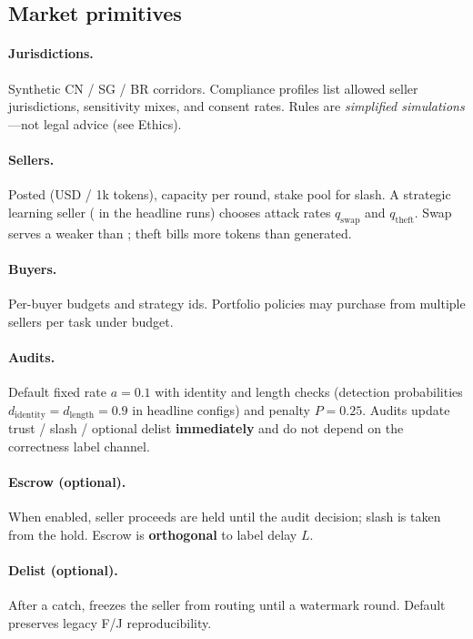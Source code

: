 \documentclass[sigconf,review]{acmart}
\begin{document}
\subsection{Market primitives}
\label{sec:primitives}

\paragraph{Jurisdictions.} Synthetic CN / SG / BR corridors. Compliance profiles list allowed seller jurisdictions, sensitivity mixes, and consent rates. Rules are \emph{simplified simulations}---not legal advice (see Ethics).

\paragraph{Sellers.} Posted  (USD / 1k tokens), capacity per round, stake pool for slash. A strategic learning seller ( in the headline runs) chooses attack rates $q_{\mathrm{swap}}$ and $q_{\mathrm{theft}}$. Swap serves a weaker  than ; theft bills more tokens than generated.

\paragraph{Buyers.} Per-buyer budgets and strategy ids. Portfolio policies may purchase from multiple sellers per task under budget.

\paragraph{Audits.} Default fixed rate $a=0.1$ with identity and length checks (detection probabilities $d_{\mathrm{identity}}=d_{\mathrm{length}}=0.9$ in headline configs) and penalty $P=0.25$. Audits update trust / slash / optional delist \textbf{immediately} and do not depend on the correctness label channel.

\paragraph{Escrow (optional).} When enabled, seller proceeds are held until the audit decision; slash is taken from the hold. Escrow is \textbf{orthogonal} to label delay $L$.

\paragraph{Delist (optional).} After a catch,  freezes the seller from routing until a watermark round. Default  preserves legacy F/J reproducibility.
\end{document}
